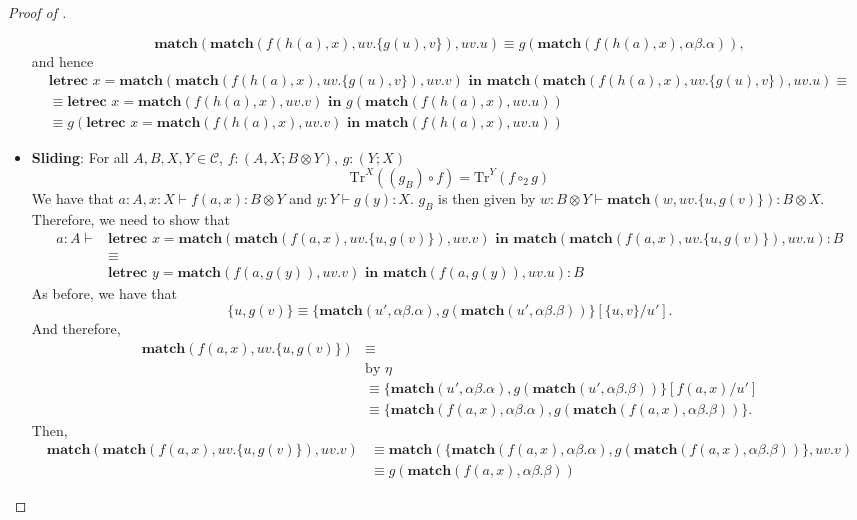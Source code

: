 \begin{proof}[Proof of ]
\begin{itemize}
\[
\textbf{match}(\textbf{match}(f(h(a),x),uv.\{g(u),v\}), uv.u) \equiv g(\textbf{match}(f(h(a),x), \alpha\beta.\alpha)),
\]
and hence
\begin{align*}
\textbf{letrec } x = \textbf{match}(\textbf{match}(f(h(a),x), uv.\{g(u),v\}), uv.v) \textbf{ in } \textbf{match}(\textbf{match}(f(h(a),x), uv.\{g(u),v\}),uv.u) \equiv\\
\equiv \textbf{letrec } x = \textbf{match}(f(h(a),x), uv.v) \textbf{ in } g(\textbf{match}(f(h(a),x), uv.u))\\
\equiv g(\textbf{letrec } x = \textbf{match}(f(h(a),x), uv.v) \textbf{ in } \textbf{match}(f(h(a),x), uv.u))
\end{align*}
\item \textbf{Sliding}: For all $A,B,X,Y \in \mathcal{C}$, $f : (A,X;B \otimes Y)$, $g : (Y;X)$
\[
\text{Tr}^{X}((g_{B}) \circ f) = \text{Tr}^{Y}(f \circ_2 g)
\]
We have that $a : A, x : X \vdash f(a,x) : B \otimes Y$ and $y : Y \vdash g(y) : X$.
$g_{B}$ is then given by $w : B \otimes Y \vdash \textbf{match}(w, uv. \{u, g(v)\}) : B \otimes X$.
Therefore, we need to show that
\begin{align*}
a : A \vdash &\textbf{letrec } x = \textbf{match}(\textbf{match}(f(a,x), uv.\{u,g(v)\}), uv.v) \textbf{ in } \textbf{match}(\textbf{match}(f(a,x), uv. \{u, g(v)\}), uv.u) : B\\
&\equiv\\ 
&\textbf{letrec } y = \textbf{match}(f(a,g(y)), uv.v) \textbf{ in } \textbf{match}(f(a,g(y)), uv.u): B
\end{align*}
As before, we have that
\[
\{u, g(v)\} \equiv \{\textbf{match}(u', \alpha\beta.\alpha), g(\textbf{match}(u', \alpha\beta.\beta))\}[\{u,v\}/u'].
\]
And therefore,
\begin{align*}
\textbf{match}(f(a,x), uv.\{u,g(v)\}) &\equiv\\
&\text{by $\eta$}\\
&\equiv \{\textbf{match}(u', \alpha\beta.\alpha), g(\textbf{match}(u', \alpha\beta.\beta))\}[f(a,x) / u']\\
&\equiv \{\textbf{match}(f(a,x), \alpha\beta.\alpha), g(\textbf{match}(f(a,x), \alpha\beta.\beta))\}.
\end{align*}
Then,
\begin{align*}
  \textbf{match}(\textbf{match}(f(a,x),uv.\{u,g(v)\}), uv.v) &\equiv \textbf{match}(\{\textbf{match}(f(a,x), \alpha\beta.\alpha), g(\textbf{match}(f(a,x), \alpha\beta.\beta))\}, uv.v)\\
  &\equiv g(\textbf{match}(f(a,x), \alpha\beta.\beta))

\end{align*}
\end{itemize}
\end{proof}
